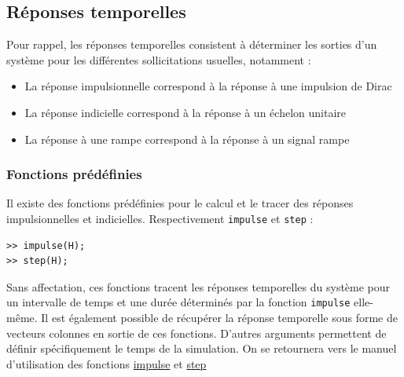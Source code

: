 \subsection{Réponses temporelles}
Pour rappel, les réponses temporelles consistent à déterminer les sorties 
d'un système pour les différentes sollicitations usuelles, notamment :
\begin{itemize}
    \item La réponse impulsionnelle correspond à la réponse 
          à une impulsion de Dirac
    \item La réponse indicielle correspond à la réponse à un échelon unitaire
    \item La réponse à une rampe correspond à la réponse à un signal rampe
\end{itemize}
\subsubsection{Fonctions prédéfinies}
Il existe des fonctions prédéfinies pour le calcul et le tracer des 
réponses impulsionnelles et indicielles. Respectivement \texttt{impulse} 
et \texttt{step} :
\begin{verbatim}
>> impulse(H);
>> step(H);
\end{verbatim}
Sans affectation, ces fonctions tracent les réponses temporelles du système pour
un intervalle de temps et une durée déterminés par la fonction \texttt{impulse} 
elle-même.
Il est également possible de récupérer la réponse temporelle sous forme 
de vecteurs colonnes en sortie de ces fonctions. D'autres arguments permettent 
de définir spécifiquement le temps de la simulation.
On se retournera vers le manuel d'utilisation des 
fonctions 
\href{https://fr.mathworks.com/help/control/ref/dynamicsystem.impulse.html}
     {impulse} 
et 
\href{https://fr.mathworks.com/help/control/ref/dynamicsystem.step.html}
     {step}~\cite{impulse,step}
